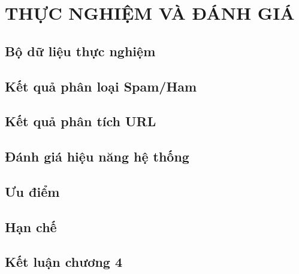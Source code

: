 \clearpage
\chapter{THỰC NGHIỆM VÀ ĐÁNH GIÁ}
\section{Bộ dữ liệu thực nghiệm}
\section{Kết quả phân loại Spam/Ham}
\section{Kết quả phân tích URL}
\section{Đánh giá hiệu năng hệ thống}
\section{Ưu điểm}
\section{Hạn chế}
\section{Kết luận chương 4}
